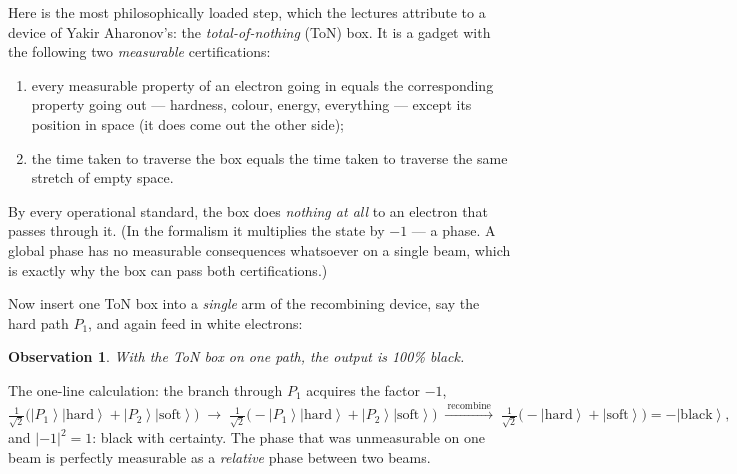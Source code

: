 \documentclass[11pt,a4paper]{article}
\newcommand{\ket}[1]{\left|#1\right\rangle}
\newcommand{\hard}{\ket{\mathrm{hard}}}
\newcommand{\soft}{\ket{\mathrm{soft}}}
\newcommand{\black}{\ket{\mathrm{black}}}
\newtheorem{obs}{Observation}
\theoremstyle{remark}
\begin{document}
Here is the most philosophically loaded step, which the lectures attribute to a
device of Yakir Aharonov's: the \emph{total-of-nothing} (ToN) box. It is a gadget
with the following two \emph{measurable} certifications:
\begin{enumerate}[nosep]
  \item every measurable property of an electron going in equals the corresponding
        property going out --- hardness, colour, energy, everything --- except its
        position in space (it does come out the other side);
  \item the time taken to traverse the box equals the time taken to traverse the
        same stretch of empty space.
\end{enumerate}
By every operational standard, the box does \emph{nothing at all} to an electron
that passes through it. (In the formalism it multiplies the state by $-1$ --- a
phase. A global phase has no measurable consequences whatsoever on a single beam,
which is exactly why the box can pass both certifications.)

Now insert one ToN box into a \emph{single} arm of the recombining device, say the
hard path $P_1$, and again feed in white electrons:

\begin{obs}
With the ToN box on one path, the output is 100\% \emph{black}.
\end{obs}

The one-line calculation: the branch through $P_1$ acquires the factor $-1$,
\begin{equation}
 \tfrac{1}{\sqrt2}\bigl(\ket{P_1}\hard + \ket{P_2}\soft\bigr)
 \;\longrightarrow\;
 \tfrac{1}{\sqrt2}\bigl(-\ket{P_1}\hard + \ket{P_2}\soft\bigr)
 \;\xrightarrow{\ \text{recombine}\ }\;
 \tfrac{1}{\sqrt2}\bigl(-\hard+\soft\bigr) = -\black ,
\end{equation}
and $|{-}1|^2=1$: black with certainty. The phase that was unmeasurable on one beam
is perfectly measurable as a \emph{relative} phase between two beams.
\end{document}
